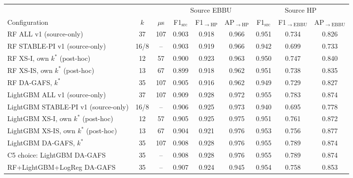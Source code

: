 \begin{tabular}{lcccccccc}
\toprule
& & & \multicolumn{3}{c}{Source EBBU} & \multicolumn{3}{c}{Source HP} \\
\cmidrule(lr){4-6}\cmidrule(lr){7-9}
Configuration & $k$ & $\mu$s & F1$_{\mathrm{src}}$ & F1$_{\rightarrow\mathrm{HP}}$ & AP$_{\rightarrow\mathrm{HP}}$ & F1$_{\mathrm{src}}$ & F1$_{\rightarrow\mathrm{EBBU}}$ & AP$_{\rightarrow\mathrm{EBBU}}$ \\
\midrule
RF ALL v1 (source-only) & 37 & 107 & 0.903 & 0.918 & 0.966 & 0.951 & 0.734 & 0.826 \\
RF STABLE-PI v1 (source-only) & 16/8 & -- & 0.903 & 0.919 & 0.966 & 0.942 & 0.699 & 0.733 \\
RF XS-I, own $k^*$ (post-hoc) & 12 & 57 & 0.900 & 0.923 & 0.963 & 0.950 & 0.747 & 0.840 \\
RF XS-IS, own $k^*$ (post-hoc) & 13 & 67 & 0.899 & 0.918 & 0.962 & 0.951 & 0.738 & 0.835 \\
RF DA-GAFS, $k^*$ & 35 & 107 & 0.905 & 0.916 & 0.962 & 0.949 & 0.729 & 0.827 \\
\midrule
LightGBM ALL v1 (source-only) & 37 & 107 & 0.909 & 0.928 & 0.972 & 0.955 & 0.783 & 0.874 \\
LightGBM STABLE-PI v1 (source-only) & 16/8 & -- & 0.906 & 0.925 & 0.973 & 0.940 & 0.695 & 0.778 \\
LightGBM XS-I, own $k^*$ (post-hoc) & 12 & 57 & 0.905 & 0.925 & 0.975 & 0.951 & 0.761 & 0.872 \\
LightGBM XS-IS, own $k^*$ (post-hoc) & 13 & 67 & 0.904 & 0.921 & 0.976 & 0.953 & 0.756 & 0.877 \\
LightGBM DA-GAFS, $k^*$ & 35 & 107 & 0.908 & 0.928 & 0.976 & 0.955 & 0.789 & 0.874 \\
\midrule
C5 choice: LightGBM DA-GAFS & 35 & -- & 0.908 & 0.928 & 0.976 & 0.955 & 0.789 & 0.874 \\
RF+LightGBM+LogReg DA-GAFS & 35 & -- & 0.907 & 0.924 & 0.945 & 0.954 & 0.758 & 0.853 \\
\bottomrule
\end{tabular}
